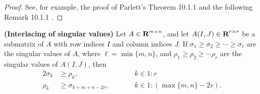 \documentclass{article}
\begin{document}
	\begin{proof}
		See, for example, the proof of Parlett's Theorem 10.1.1 and the following Remark 10.1.1 \cite{parlett_1998}.
	\end{proof}
	
	\begin{lem} \textnormal{\bf(Interlacing of singular values)}
		\label{lem:singular_interlace}
		Let $A \in \textnormal{\bf R}^{m\times n}$, and let $A(I,J) \in \textnormal{\bf R}^{r\times r}$ be a submatrix of $A$ with row indices $I$ and column indices $J$. If $\sigma_1 \ge \sigma_2 \ge \cdots\ge \sigma_{\ell}$ are the singular values of $A$, where $\ell = \min\{m,n\}$, and $\rho_1 \ge \rho_2 \ge\cdots \rho_r$ are the singular values of $A(I,J)$, then
		\begin{alignat}{2}
			\sigma_k &\ge \rho_k,& &\qquad k \in 1:r \\
			\rho_k &\ge \sigma_{k + m+n -2r},&&\qquad k \in 1:(\max\{m,n\} - 2r).
		\end{alignat}
	\end{lem}
	
\end{document}
